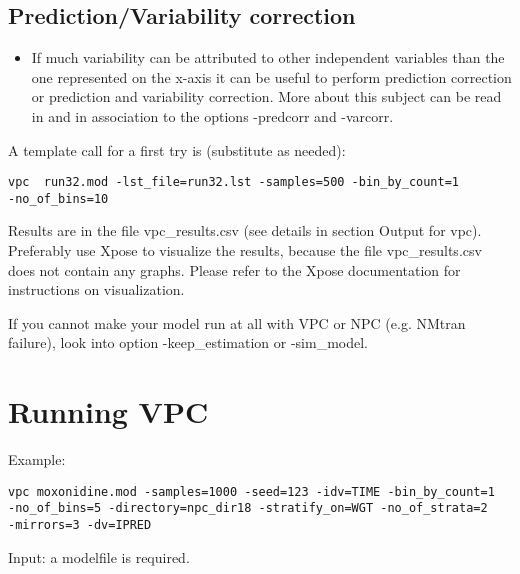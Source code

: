 \subsection{Prediction/Variability correction}

\begin{itemize}
	\item If much variability can be attributed to other independent variables than the one represented on the x-axis it can be useful to perform prediction correction or prediction and variability correction. More about this subject can be read in \cite{Bergstrand} and in association to the options -predcorr and -varcorr.
\end{itemize}

A template call for a first try is (substitute as needed):
\begin{verbatim}
vpc  run32.mod -lst_file=run32.lst -samples=500 -bin_by_count=1
-no_of_bins=10
\end{verbatim}
Results are in the file vpc\_results.csv (see details in section Output for vpc). Preferably use Xpose to visualize the results, because the file vpc\_results.csv does not contain any graphs. Please refer to the Xpose documentation for instructions on visualization.

If you cannot make your model run at all with VPC or NPC (e.g. NMtran failure), look into option -keep\_estimation or -sim\_model. 

\section{Running VPC}
Example:

\begin{verbatim}
vpc moxonidine.mod -samples=1000 -seed=123 -idv=TIME -bin_by_count=1
-no_of_bins=5 -directory=npc_dir18 -stratify_on=WGT -no_of_strata=2
-mirrors=3 -dv=IPRED
\end{verbatim}

Input:  a modelfile is required.


